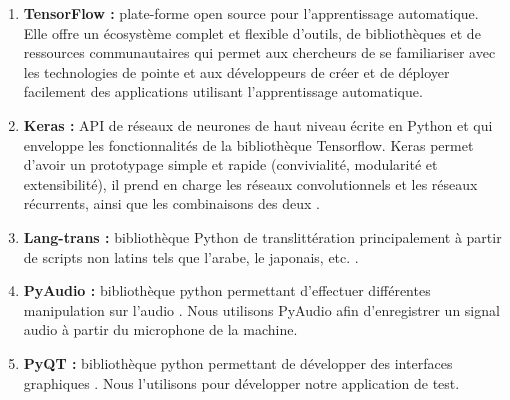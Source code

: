 \begin{enumerate}
    \item \textbf{TensorFlow :} plate-forme open source pour l'apprentissage automatique. Elle offre un écosystème complet et flexible d’outils, de bibliothèques et de ressources communautaires qui permet aux chercheurs de se familiariser avec les technologies de pointe et aux développeurs de créer et de déployer facilement des applications utilisant l'apprentissage automatique. \\
    
    \item \textbf{Keras :} API de réseaux de neurones de haut niveau écrite en Python et qui enveloppe les fonctionnalités de la bibliothèque Tensorflow. Keras permet d'avoir un prototypage simple et rapide (convivialité, modularité et extensibilité), il prend en charge les réseaux convolutionnels et les réseaux récurrents, ainsi que les combinaisons des deux \cite{keras}. \\
    
    \item \textbf{Lang-trans :} bibliothèque Python de translittération principalement à partir de scripts non latins tels que l'arabe, le japonais, etc. \cite{translang}. \\
    
    \item \textbf{PyAudio :} bibliothèque python permettant d'effectuer différentes manipulation sur l'audio \cite{PyAudio}. Nous utilisons PyAudio afin d'enregistrer un signal audio à partir du microphone de la machine. \\
    
    \item \textbf{PyQT :} bibliothèque python permettant de développer des interfaces graphiques \cite{pyqt}. Nous l'utilisons pour développer notre application de test.
\end{enumerate} 
